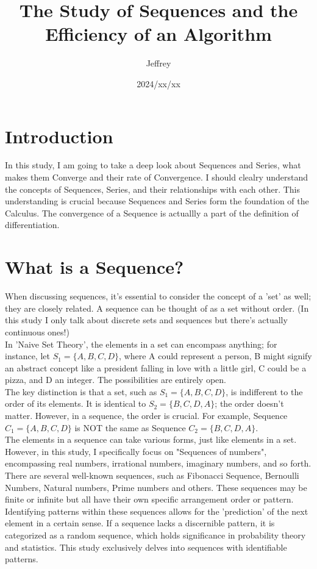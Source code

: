 \documentclass{article}
\title{The Study of Sequences and the Efficiency of an Algorithm}
\author{Jeffrey}
\date{2024/xx/xx}
\begin{document}
\maketitle
  \section{Introduction}
  In this study, I am going to take a deep look about Sequences and Series, what makes them Converge and their rate of Convergence. I should clealry understand the concepts of Sequences, Series, and their relationships with each other. This understanding is crucial because Sequences and Series form the foundation of the Calculus. The convergence of a Sequence is actuallly a part of the definition of differentiation.

  \section{What is a Sequence?}
  When discussing sequences, it's essential to consider the concept of a 'set' as well; they are closely related. A sequence can be thought of as a set without order. (In this study I only talk about discrete sets and sequences but there's actually continuous ones!) \\

  In 'Naive Set Theory', the elements in a set can encompass anything; for instance, let $S_1=\{A, B, C, D\}$, where A could represent a person, B might signify an abstract concept like a president falling in love with a little girl, C could be a pizza, and D an integer. The possibilities are entirely open. \\

  The key distinction is that a set, such as $S_1=\{A, B, C, D\}$, is indifferent to the order of its elements. It is identical to $S_2=\{B, C, D, A\}$; the order doesn't matter. However, in a sequence, the order is crucial. For example, Sequence $C_1=\{A, B, C, D\}$ is NOT the same as Sequence $C_2=\{B, C, D, A\}$. \\

  The elements in a sequence can take various forms, just like elements in a set. However, in this study, I specifically focus on "Sequences of numbers", encompassing real numbers, irrational numbers, imaginary numbers, and so forth. \\ 

  There are several well-known sequences, such as Fibonacci Sequence, Bernoulli Numbers, Natural numbers, Prime numbers and others. These sequences may be finite or infinite but all have their own specific arrangement order or pattern. Identifying patterns within these sequences allows for the 'prediction' of the next element in a certain sense. If a sequence lacks a discernible pattern, it is categorized as a random sequence, which holds significance in probability theory and statistics. This study exclusively delves into sequences with identifiable patterns. \\
\end{document}
